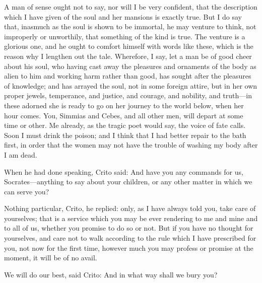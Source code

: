 A man of sense ought not to say, nor will I be very confident, that the
description which I have given of the soul and her mansions is exactly
true. But I do say that, inasmuch as the soul is shown to be immortal, he
may venture to think, not improperly or unworthily, that something of the
kind is true. The venture is a glorious one, and he ought to comfort
himself with words like these, which is the reason why I lengthen out the
tale. Wherefore, I say, let a man be of good cheer about his soul, who
having cast away the pleasures and ornaments of the body as alien to him
and working harm rather than good, has sought after the pleasures of
knowledge; and has arrayed the soul, not in some foreign attire, but in
her own proper jewels, temperance, and justice, and courage, and nobility,
and truth—in these adorned she is ready to go on her journey to the
world below, when her hour comes. You, Simmias and Cebes, and all other
men, will depart at some time or other. Me already, as the tragic poet
would say, the voice of fate calls. Soon I must drink the poison; and I
think that I had better repair to the bath first, in order that the women
may not have the trouble of washing my body after I am dead.

When he had done speaking, Crito said: And have you any commands for us,
Socrates—anything to say about your children, or any other matter in
which we can serve you?

Nothing particular, Crito, he replied: only, as I have always told you,
take care of yourselves; that is a service which you may be ever rendering
to me and mine and to all of us, whether you promise to do so or not. But
if you have no thought for yourselves, and care not to walk according to
the rule which I have prescribed for you, not now for the first time,
however much you may profess or promise at the moment, it will be of no
avail.

We will do our best, said Crito: And in what way shall we bury you?

